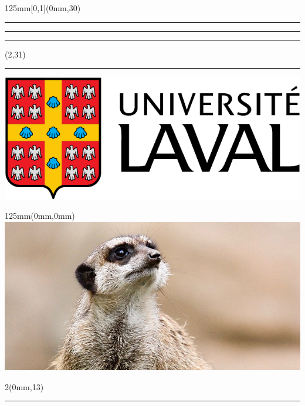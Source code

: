 \begin{frame}[plain]
  \begin{textblock*}{125mm}[0,1](0mm,30\TPVertModule)
    \textcolor{rouge}{\rule{\banderougewidth}{\banderougeheight}}%
    \rule{\gapwidth}{0pt}%
    \textcolor{or}{\rule{\bandeorwidth}{\bandeorheight}}           %
  \end{textblock*}

  \begin{textblock*}{\TPHorizModule}(2\TPHorizModule,31\TPVertModule)
    \rule{\gapwidth}{0pt}%
    \includegraphics[height=\logoheight,keepaspectratio=true]{ul_p}
  \end{textblock*}

  \begin{textblock*}{125mm}(0mm,0mm)
    \includegraphics[width=\imagewidth,%
                     keepaspectratio=true]{Suricata-diapos.jpg}
  \end{textblock*}

  \begin{textblock*}{2\TPHorizModule}(0mm,13\TPVertModule)
    \textcolor{white}{\rule{\linewidth}{11\TPVertModule}}
  \end{textblock*}


\end{frame}
